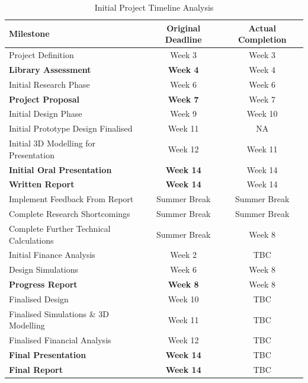 \begin{table}[H]
	\centering
	\begin{tabular}{||p{5cm} c c||} 
		\hline
		\textbf{Milestone} & \textbf{Original Deadline} & \textbf{Actual Completion} \\ [0.5ex] 
		\hline\hline
		Project Definition 							& Week 3 			& Week 3\\ 
		\textbf{Library Assessment} 				& \textbf{Week 4} 	& Week 4\\
		Initial Research Phase 						& Week 6 			& Week 6\\
		\textbf{Project Proposal} 					& \textbf{Week 7} 	& Week 7\\
		Initial Design Phase 						& Week 9			& Week 10\\
		Initial Prototype Design Finalised 			& Week 11 			& NA\\
		Initial 3D Modelling for Presentation 		& Week 12 			& Week 11\\ 
		\textbf{Initial Oral Presentation} 			& \textbf{Week 14} 	& Week 14\\
		\textbf{Written Report} 					& \textbf{Week 14} 	& Week 14\\ 
		Implement Feedback From Report 				& Summer Break 		& Summer Break \\
		Complete Research Shortcomings 				& Summer Break 		& Summer Break \\
		Complete Further Technical Calculations 	& Summer Break 		& Week 8 \\
		Initial Finance Analysis 					& Week 2 			& TBC \\
		Design Simulations 							& Week 6 			& Week 8 \\ 
		\textbf{Progress Report} 					& \textbf{Week 8} 	& Week 8 \\
		Finalised Design 							& Week 10 			& TBC \\
		Finalised Simulations \& 3D Modelling 		& Week 11 			& TBC \\
		Finalised Financial Analysis 				& Week 12 			& TBC \\ 
		\textbf{Final Presentation} 				& \textbf{Week 14} 	& TBC\\
		\textbf{Final Report} 						& \textbf{Week 14} 	& TBC\\ [1ex] 
		\hline
	\end{tabular}
	\caption{Initial Project Timeline Analysis}
	\label{table:timeline_revised}
\end{table}      



